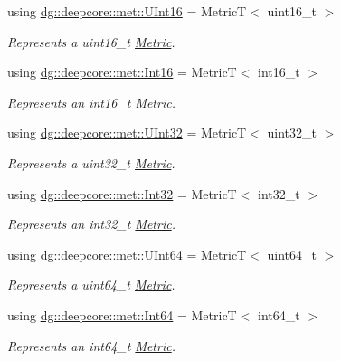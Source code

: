 \begin{DoxyCompactItemize}
using \hyperlink{group___process_metrics_ga234f31e63c02211edabdbc7423c4e0ab}{dg\+::deepcore\+::met\+::\+U\+Int16} = MetricT$<$ uint16\+\_\+t $>$
\begin{DoxyCompactList}\small\item\em Represents a {\ttfamily uint16\+\_\+t} \hyperlink{classdg_1_1deepcore_1_1_metric}{Metric}. \end{DoxyCompactList}\item 
using \hyperlink{group___process_metrics_gaa7db3a7893443501f99763fcc0e861ac}{dg\+::deepcore\+::met\+::\+Int16} = MetricT$<$ int16\+\_\+t $>$
\begin{DoxyCompactList}\small\item\em Represents an {\ttfamily int16\+\_\+t} \hyperlink{classdg_1_1deepcore_1_1_metric}{Metric}. \end{DoxyCompactList}\item 
using \hyperlink{group___process_metrics_gab9fce2fcdfa656ff597d286163c3e220}{dg\+::deepcore\+::met\+::\+U\+Int32} = MetricT$<$ uint32\+\_\+t $>$
\begin{DoxyCompactList}\small\item\em Represents a {\ttfamily uint32\+\_\+t} \hyperlink{classdg_1_1deepcore_1_1_metric}{Metric}. \end{DoxyCompactList}\item 
using \hyperlink{group___process_metrics_ga9092703cdbc8630f71539fc8c9f8802c}{dg\+::deepcore\+::met\+::\+Int32} = MetricT$<$ int32\+\_\+t $>$
\begin{DoxyCompactList}\small\item\em Represents an {\ttfamily int32\+\_\+t} \hyperlink{classdg_1_1deepcore_1_1_metric}{Metric}. \end{DoxyCompactList}\item 
using \hyperlink{group___process_metrics_ga18c2b99cb1071590aa42afa19c39f7b9}{dg\+::deepcore\+::met\+::\+U\+Int64} = MetricT$<$ uint64\+\_\+t $>$
\begin{DoxyCompactList}\small\item\em Represents a {\ttfamily uint64\+\_\+t} \hyperlink{classdg_1_1deepcore_1_1_metric}{Metric}. \end{DoxyCompactList}\item 
using \hyperlink{group___process_metrics_ga97b1089cad8551af2bcb35e88a034469}{dg\+::deepcore\+::met\+::\+Int64} = MetricT$<$ int64\+\_\+t $>$
\begin{DoxyCompactList}\small\item\em Represents an {\ttfamily int64\+\_\+t} \hyperlink{classdg_1_1deepcore_1_1_metric}{Metric}. \end{DoxyCompactList}\item 

\end{DoxyCompactItemize}
